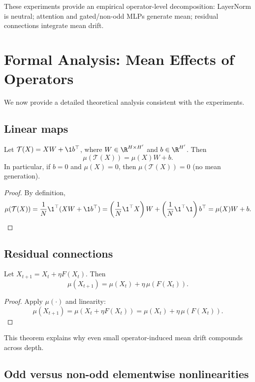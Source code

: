 These experiments provide an empirical operator-level decomposition:
LayerNorm is neutral; attention and gated/non-odd MLPs generate mean; residual connections integrate mean drift.

\section{Formal Analysis: Mean Effects of Operators}

We now provide a detailed theoretical analysis consistent with the experiments.

\subsection{Linear maps}

\begin{theorem}
\label{thm:linear_mean}
Let $\mathcal{T}(X)=XW+\1 b^\top$, where $W\in\R^{H\times H'}$ and $b\in\R^{H'}$.
Then
\[
\mu(\mathcal{T}(X)) = \mu(X)W + b.
\]
In particular, if $b=0$ and $\mu(X)=0$, then $\mu(\mathcal{T}(X))=0$ (no mean generation).
\end{theorem}

\begin{proof}
By definition,
\[
\mu(\mathcal{T}(X))
= \frac{1}{N}\1^\top(XW+\1 b^\top)
= \left(\frac{1}{N}\1^\top X\right)W + \left(\frac{1}{N}\1^\top\1\right)b^\top
= \mu(X)W + b.
\]
\end{proof}

\subsection{Residual connections}

\begin{theorem}
\label{thm:residual_mean}
Let $X_{t+1}=X_t+\eta F(X_t)$. Then
\[
\mu(X_{t+1}) = \mu(X_t) + \eta\,\mu(F(X_t)).
\]
\end{theorem}

\begin{proof}
Apply $\mu(\cdot)$ and linearity:
\[
\mu(X_{t+1})
=\mu(X_t+\eta F(X_t))
=\mu(X_t)+\eta\,\mu(F(X_t)).
\]
\end{proof}

This theorem explains why even small operator-induced mean drift compounds across depth.

\subsection{Odd versus non-odd elementwise nonlinearities}

